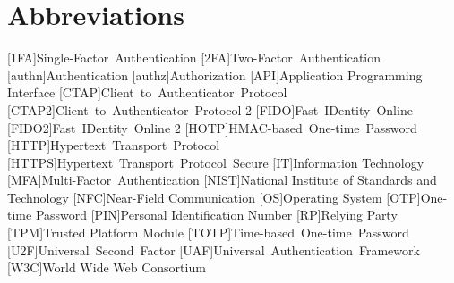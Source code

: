 \documentclass[twoside,twocolumn]{article}
\title{\mytitle} %
\author{%
  \textsc{Nils Siegle} \\[1ex] %
  \normalsize 3087271 \\ %
  \normalsize \href{mailto:nils.siegle@stud.uni-due.de}{nils.siegle@stud.uni-due.de} %
}
\date{\today} %
\begin{document}
\maketitle

\newpage
\onecolumn
\tableofcontents
\newpage


\section*{Abbreviations}
\begin{acronym}[AAAAAAA]
  [1FA]{Single-Factor Authentication}
  [2FA]{Two-Factor Authentication}
  [authn]{Authentication}
  [authz]{Authorization}
  [API]{Application Programming Interface}
  [CTAP]{Client to Authenticator Protocol}
  [CTAP2]{Client to Authenticator Protocol 2}
  [FIDO]{Fast IDentity Online}
  [FIDO2]{Fast IDentity Online 2}
  [HOTP]{HMAC-based One-time Password}
  [HTTP]{Hypertext Transport Protocol}
  [HTTPS]{Hypertext Transport Protocol Secure}
  [IT]{Information Technology}
  [MFA]{Multi-Factor Authentication}
  [NIST]{National Institute of Standards and Technology}
  [NFC]{Near-Field Communication}
  [OS]{Operating System}
  [OTP]{One-time Password}
  [PIN]{Personal Identification Number}
  [RP]{Relying Party}
  [TPM]{Trusted Platform Module}
  [TOTP]{Time-based One-time Password}
  [U2F]{Universal Second Factor}
  [UAF]{Universal Authentication Framework}
  [W3C]{World Wide Web Consortium}
\end{acronym}


\newpage
\twocolumn

\end{document}

